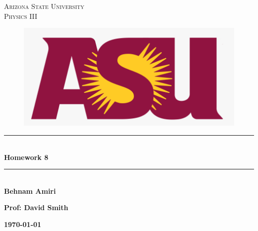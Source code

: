 \documentclass[fleqn]{article}
\begin{document}
  \begin{titlepage}

    \newcommand{\HRule}{\rule{\linewidth}{0.5mm}} %

    \center %
    


    \textsc{\LARGE Arizona State University}\\[1.5cm] %

    \textsc{\LARGE Physics III }\\[1.5cm] %


    \begin{figure}
      \includegraphics[width=\linewidth]{asu.png}
    \end{figure}


    \HRule \\[0.4cm]
    { \huge \bfseries Homework 8}\\[0.4cm] 
    \HRule \\[1.5cm]
    
    \textbf{Behnam Amiri}

    \bigbreak

    \textbf{Prof: David Smith}

    \bigbreak


    \textbf{{\large \today}\\[2cm]}

    \vfill %

  \end{titlepage}
\end{document}
